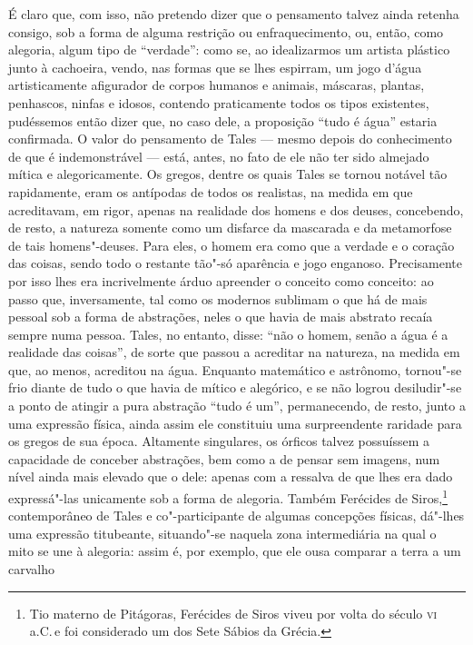É claro que, com isso, não pretendo dizer que o pensamento talvez ainda
retenha consigo, sob a forma de alguma restrição ou enfraquecimento, ou,
então, como alegoria, algum tipo de ``verdade'': como se, ao idealizarmos um
artista plástico junto à cachoeira, vendo, nas formas que se lhes espirram,
um jogo d'água artisticamente afigurador de corpos humanos e animais,
máscaras, plantas, penhascos, ninfas e idosos, contendo praticamente todos os
tipos existentes, pudéssemos então dizer que, no caso dele, a proposição
``tudo é água'' estaria confirmada. O valor do pensamento de Tales --- mesmo
depois do \label{pensamentodetales} conhecimento de que é
indemonstrável --- está, antes, no fato de ele não ter sido almejado mítica e
alegoricamente. Os gregos, dentre os quais Tales se tornou notável tão
rapidamente, eram os antípodas de todos os realistas, na medida em que
acreditavam, em rigor, apenas na realidade dos homens e dos deuses,
concebendo, de resto, a natureza somente como um disfarce da mascarada e da
metamorfose de tais homens"-deuses. Para eles, o homem era como que a verdade
e o coração das coisas, sendo todo o restante tão"-só aparência e jogo
enganoso. Precisamente por isso lhes era incrivelmente árduo apreender o
conceito como conceito: ao passo \label{incrivelmentearduo} que,
inversamente, tal como os modernos sublimam o que há de mais pessoal sob a
forma de abstrações, neles o que havia de mais abstrato recaía sempre numa
pessoa. Tales, no entanto, disse: ``não o homem, senão a água é a realidade
das coisas'', de sorte que passou a acreditar na natureza, na medida em que,
ao menos, acreditou na água. Enquanto matemático e astrônomo, tornou"-se frio
diante de tudo o que havia de mítico e alegórico, e se não logrou
desiludir"-se a ponto de atingir a pura abstração ``tudo é um'',
permanecendo, de resto, junto a uma expressão física, ainda assim ele
constituiu uma surpreendente raridade para os gregos de sua época. Altamente
singulares, os órficos talvez possuíssem a capacidade de conceber abstrações,
bem como a de pensar sem imagens, num nível ainda mais elevado que o dele:
apenas com a ressalva de que lhes era dado expressá"-las unicamente sob a
forma de alegoria. Também Ferécides de Siros,\footnote{Tio materno de
Pitágoras, Ferécides de Siros viveu por volta do século \textsc{vi} a.C.\,e
foi considerado um dos Sete Sábios da Grécia.} contemporâneo de Tales e
co"-participante de algumas concepções físicas, dá"-lhes uma expressão
titubeante, situando"-se naquela zona intermediária na qual o mito se une à
alegoria: assim é, por exemplo, que ele ousa comparar a terra a um carvalho
